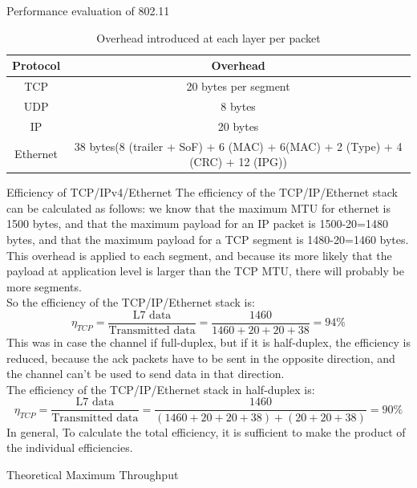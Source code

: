 \begin{section}{Performance evaluation of 802.11}
  
  \begin{table}[h]
    \centering
    \begin{tabular}{|c|c|}
      \hline
      Protocol & Overhead \\
      \hline
      TCP & 20 bytes per segment\\
      \hline
      UDP & 8 bytes\\
      \hline
      IP & 20 bytes\\
      \hline
      Ethernet & 38 bytes(8 (trailer + SoF) + 6 (MAC) + 6(MAC) + 2 (Type) + 4 (CRC) + 12 (IPG))\\
      \hline
    \end{tabular}
    \caption{Overhead introduced at each layer per packet}
  \end{table}
  \begin{subsubsection}{Efficiency of TCP/IPv4/Ethernet}
    The efficiency of the TCP/IP/Ethernet stack can be calculated as follows: we know that the 
    maximum MTU for ethernet is 1500 bytes, and that the maximum payload for an IP packet is 1500-20=1480
    bytes, and that the maximum payload for a TCP segment is 1480-20=1460 bytes.\\
    This overhead is applied to each segment, and because its more likely that the payload at application 
    level is larger than the TCP MTU, there will probably be more segments.\\
    So the efficiency of the TCP/IP/Ethernet stack is:
    \begin{equation}
      \eta_{TCP} = \frac{\text{L7 data}}{\text{Transmitted data}} = \frac{1460}{1460+20+20+38} = 94\%
    \end{equation}
    This was in case the channel if full-duplex, but if it is half-duplex, the efficiency is reduced, because
    the ack packets have to be sent in the opposite direction, and the channel can't be used to send data
    in that direction.\\
    The efficiency of the TCP/IP/Ethernet stack in half-duplex is:
    \begin{equation}
      \eta_{TCP} = \frac{\text{L7 data}}{\text{Transmitted data}} = \frac{1460}{(1460+20+20+38)+(20+20+38)} = 90\%
    \end{equation}
    In general, To calculate the total efficiency, it is sufficient to make the product of the
    individual efficiencies.
  \end{subsubsection}
  \begin{subsection}{Theoretical Maximum Throughput}

\end{subsection}
\end{section}
